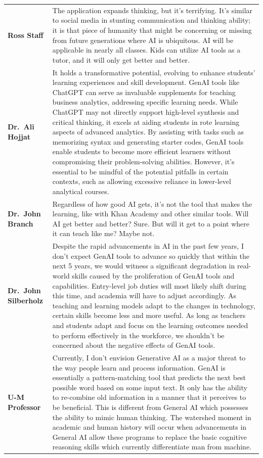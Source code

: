 \documentclass[
]{book}
\begin{document}
\begin{longtable}[]{@{}
  >{\raggedright\arraybackslash}p{}
  >{\raggedright\arraybackslash}p{}@{}}
\toprule\noalign{}
\endhead
\bottomrule\noalign{}
\endlastfoot
\textbf{Ross Staff} & The application expands thinking, but it's terrifying. It's similar to social media in stunting communication and thinking ability; it is that piece of humanity that might be concerning or missing from future generations where AI is ubiquitous. AI will be applicable in nearly all classes. Kids can utilize AI tools as a tutor, and it will only get better and better. \\
\textbf{Dr.~Ali Hojjat} & It holds a transformative potential, evolving to enhance students' learning experiences and skill development. GenAI tools like ChatGPT can serve as invaluable supplements for teaching business analytics, addressing specific learning needs. While ChatGPT may not directly support high-level synthesis and critical thinking, it excels at aiding students in rote learning aspects of advanced analytics. By assisting with tasks such as memorizing syntax and generating starter codes, GenAI tools enable students to become more efficient learners without compromising their problem-solving abilities. However, it's essential to be mindful of the potential pitfalls in certain contexts, such as allowing excessive reliance in lower-level analytical courses. \\
\textbf{Dr.~John Branch} & Regardless of how good AI gets, it's not the tool that makes the learning, like with Khan Academy and other similar tools. Will AI get better and better? Sure. But will it get to a point where it can teach like me? Maybe not. \\
\textbf{Dr.~John Silberholz} & Despite the rapid advancements in AI in the past few years, I don't expect GenAI tools to advance so quickly that within the next 5 years, we would witness a significant degradation in real-world skills caused by the proliferation of GenAI tools and capabilities. Entry-level job duties will most likely shift during this time, and academia will have to adjust accordingly. As teaching and learning models adapt to the changes in technology, certain skills become less and more useful. As long as teachers and students adapt and focus on the learning outcomes needed to perform effectively in the workforce, we shouldn't be concerned about the negative effects of GenAI tools. \\
\textbf{U-M Professor} & Currently, I don't envision Generative AI as a major threat to the way people learn and process information. GenAI is essentially a pattern-matching tool that predicts the next best possible word based on some input text. It only has the ability to re-combine old information in a manner that it perceives to be beneficial. This is different from General AI which possesses the ability to mimic human thinking. The watershed moment in academic and human history will occur when advancements in General AI allow these programs to replace the basic cognitive reasoning skills which currently differentiate man from machine. \\
\end{longtable}
\end{document}

